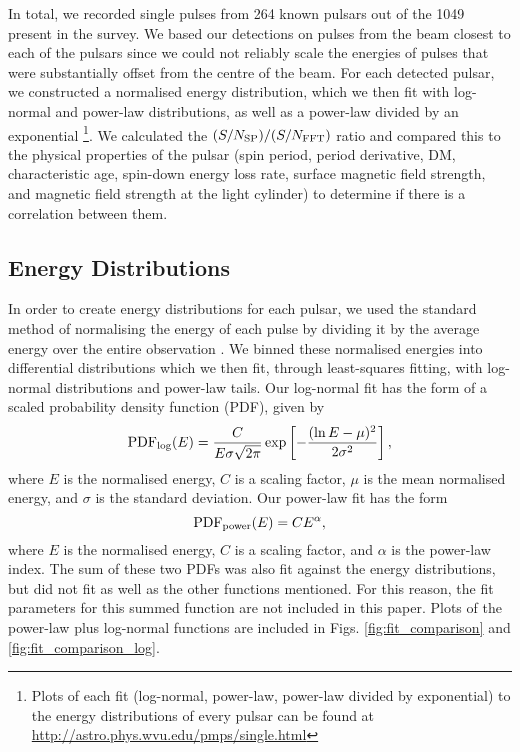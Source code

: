 \documentclass[fleqn,usenatbib]{mnras}
\begin{document}
In total, we recorded single pulses from 264 known pulsars out of the 1049 present in the survey.
We based our detections on pulses from the beam closest to each of the pulsars since we could
not reliably scale the energies of pulses that were substantially offset from the centre of the
beam. For each detected pulsar, we constructed a normalised energy distribution, which we then fit
with log-normal and power-law distributions, as well as a power-law divided by an exponential \footnote{Plots of each fit (log-normal, power-law, power-law divided by exponential) to the energy distributions of every pulsar can be found at \url{http://astro.phys.wvu.edu/pmps/single.html}}. We calculated the $(S/N_{\rm SP})/(S/N_{\rm FFT})$ ratio and compared this to the physical properties of the pulsar (spin period, period derivative, DM, characteristic age, spin-down energy loss rate, surface magnetic field strength, and magnetic field strength at the light cylinder) to determine if there is a correlation between them.

\subsection{Energy Distributions}
\label{dists}

In order to create energy distributions for each pulsar, we used the standard method of
normalising the energy of each pulse by dividing it by the average energy over the entire
observation \citep{Ritchings:1976, Biggs:1992, Burke-Spolaor:2012}. We binned these normalised
energies into differential distributions which we then fit, through least-squares fitting, with
log-normal distributions and power-law tails. Our log-normal fit has the form of a scaled
probability density function (PDF), given by
\begin{equation}
{\rm PDF}_{\rm log}(E)=\frac{C}{E\sigma\sqrt{2\pi}} \exp 
\left[ -\frac{(\ln{E}-\mu)^2}{2\sigma^2}\right],
\label{eq:lognormal}
\end{equation}
where $E$ is the normalised energy, $C$ is a scaling factor, $\mu$ is the mean normalised energy,
and $\sigma$ is the standard deviation. Our power-law fit has the form
\begin{equation}
{\rm PDF}_{\rm power}(E)=CE^{\alpha},
\label{eq:power}
\end{equation}
where $E$ is the normalised energy, $C$ is a scaling factor, and $\alpha$ is the power-law index. 
The sum of these two PDFs was also fit against the energy distributions, but did not fit as well 
as the other functions mentioned. For this reason, the fit parameters for this summed function are not included in this paper. Plots of the power-law plus log-normal functions are included in Figs. \ref{fig:fit_comparison} and \ref{fig:fit_comparison_log}.
\end{document}

